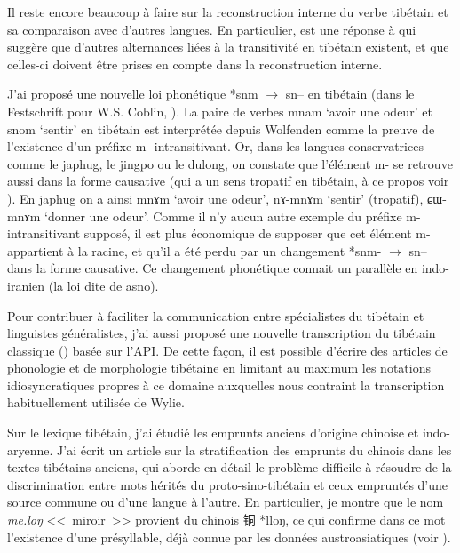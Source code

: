 \documentclass[oldfontcommands,oneside,a4paper,11pt]{memoir}
\newcommand{\ipa}[1]{{\phon #1}} %
\newcommand{\zh}[1]{{\cn #1}}
\begin{document}
Il reste encore beaucoup à faire sur la reconstruction interne du verbe tibétain et sa comparaison avec d'autres langues. En particulier,  \citet{hill14voicing} est une réponse à \citet{jacques12internal} qui suggère que d'autres alternances liées à la transitivité en tibétain existent, et que celles-ci doivent être prises en compte dans la reconstruction interne. 

J'ai proposé une nouvelle loi phonétique *snm $\rightarrow$ sn-- en tibétain (dans le Festschrift pour W.S. Coblin, \citealt{jacques14snom}). La paire de verbes \ipa{mnam} `avoir une odeur' et \ipa{snom} `sentir' en tibétain est interprétée depuis Wolfenden comme la preuve de l'existence d'un préfixe m- intransitivant. Or, dans les langues conservatrices comme le japhug, le jingpo ou le dulong, on constate que l'élément m- se retrouve aussi dans la forme causative (qui a un sens tropatif en tibétain, à ce propos voir \citealt{jacques13tropative}). En japhug on a ainsi \ipa{mnɤm} `avoir une odeur', \ipa{nɤ-mnɤm} `sentir' (tropatif), \ipa{ɕɯ-mnɤm} `donner une odeur'. Comme il n'y aucun autre exemple du préfixe m- intransitivant supposé, il est plus économique de supposer que cet élément m- appartient à la racine, et qu'il a été perdu par un changement *snm- $\rightarrow$ sn-- dans la forme causative. Ce changement phonétique connait un parallèle en indo-iranien (la loi dite de \ipa{asno}).

Pour contribuer à faciliter la communication entre spécialistes du tibétain et linguistes généralistes, j'ai aussi proposé une nouvelle transcription du tibétain classique (\citealt{jacques12transcription}) basée sur l'API. De cette façon, il est possible d'écrire des articles de phonologie et de morphologie tibétaine en limitant au maximum les notations idiosyncratiques propres à ce domaine auxquelles nous contraint la transcription habituellement utilisée de Wylie.

Sur le lexique tibétain, j’ai étudié les emprunts anciens d’origine chinoise et indo-aryenne. J’ai écrit un article sur la stratification des emprunts du chinois dans les textes tibétains anciens, qui aborde en détail le problème difficile à résoudre de la discrimination entre mots hérités du proto-sino-tibétain et ceux empruntés d’une source commune ou d’une langue à l’autre. En particulier, je montre que le nom \textit{me.loŋ} <<~miroir~>> provient du chinois \zh{铜} *lloŋ, ce qui confirme dans ce mot l'existence d'une présyllable, déjà connue par les données austroasiatiques (voir \citealt{sagart99roc}). 
\end{document}
